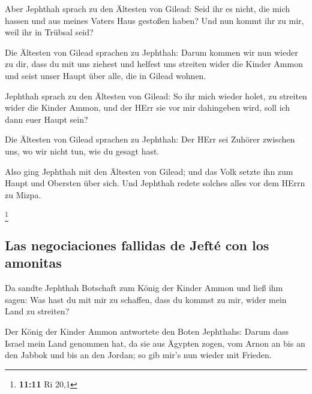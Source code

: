  Aber Jephthah sprach zu den Ältesten von Gilead: Seid ihr
es nicht, die mich hassen und aus meines Vaters Haus gestoßen haben? Und
nun kommt ihr zu mir, weil ihr in Trübsal seid?

 Die Ältesten von Gilead sprachen zu Jephthah: Darum
kommen wir nun wieder zu dir, dass du mit uns ziehest und helfest uns
streiten wider die Kinder Ammon und seist unser Haupt über alle, die in
Gilead wohnen.

 Jephthah sprach zu den Ältesten von Gilead: So ihr mich
wieder holet, zu streiten wider die Kinder Ammon, und der HErr sie vor
mir dahingeben wird, soll ich dann euer Haupt sein?

 Die Ältesten von Gilead sprachen zu Jephthah: Der HErr
sei Zuhörer zwischen uns, wo wir nicht tun, wie du gesagt hast.

 Also ging Jephthah mit den Ältesten von Gilead; und das
Volk setzte ihn zum Haupt und Obersten über sich. Und Jephthah redete
solches alles vor dem HErrn zu Mizpa.

\footnote{\textbf{11:11} Ri 20,1}

\hypertarget{las-negociaciones-fallidas-de-jeftuxe9-con-los-amonitas}{%
\subsection{Las negociaciones fallidas de Jefté con los
amonitas}\label{las-negociaciones-fallidas-de-jeftuxe9-con-los-amonitas}}

 Da sandte Jephthah Botschaft zum König der Kinder Ammon
und ließ ihm sagen: Was hast du mit mir zu schaffen, dass du kommst zu
mir, wider mein Land zu streiten?

 Der König der Kinder Ammon antwortete den Boten
Jephthahs: Darum dass Israel mein Land genommen hat, da sie aus Ägypten
zogen, vom Arnon an bis an den Jabbok und bis an den Jordan; so gib
mir's nun wieder mit Frieden.


